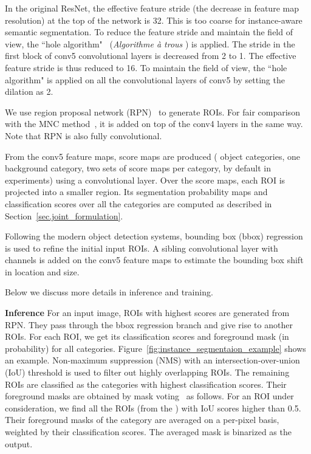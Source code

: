 \documentclass[10pt,twocolumn,letterpaper]{article}
\begin{document}
In the original ResNet, the effective feature stride (the decrease in feature map resolution) at the top of the network is 32. This is too coarse for instance-aware semantic segmentation. To reduce the feature stride and maintain the field of view, the ``hole algorithm"~\cite{chen2015semantic,long2015fully} (\emph{Algorithme \`{a} trous} \cite{mallat1999wavelet}) is applied. The stride in the first block of conv5 convolutional layers is decreased from 2 to 1. The effective feature stride is thus reduced to 16. To maintain the field of view, the ``hole algorithm" is applied on all the convolutional layers of conv5 by setting the dilation as 2.

We use region proposal network (RPN)~\cite{ren2015faster} to generate ROIs. For fair comparison with the MNC method~\cite{dai2016mnc}, it is added on top of the conv4 layers in the same way. Note that RPN is also fully convolutional.

From the conv5 feature maps,  score maps are produced ( object categories, one background category, two sets of  score maps per category,  by default in experiments) using a  convolutional layer. Over the score maps, each ROI is projected into a  smaller region. Its segmentation probability maps and classification scores over all the categories are computed as described in Section~\ref{sec.joint_formulation}.

Following the modern object detection systems, bounding box (bbox) regression~\cite{girshick2014rich,girshick2015fast} is used to refine the initial input ROIs. A sibling  convolutional layer with  channels is added on the conv5 feature maps to estimate the bounding box shift in location and size.

Below we discuss more details in inference and training.

\textbf{Inference}
For an input image,  ROIs with highest scores are generated from RPN. They pass through the bbox regression branch and give rise to another  ROIs. For each ROI, we get its classification scores and foreground mask (in probability) for all categories. Figure~\ref{fig:instance_segmentaion_example} shows an example. Non-maximum suppression (NMS) with an intersection-over-union (IoU) threshold  is used to filter out highly overlapping ROIs. The remaining ROIs are classified as the categories with highest classification scores. Their foreground masks are obtained by mask voting~\cite{dai2016mnc} as follows. For an ROI under consideration, we find all the ROIs (from the ) with IoU scores higher than 0.5. Their foreground masks of the category are averaged on a per-pixel basis, weighted by their classification scores. The averaged mask is binarized as the output.
\end{document}
